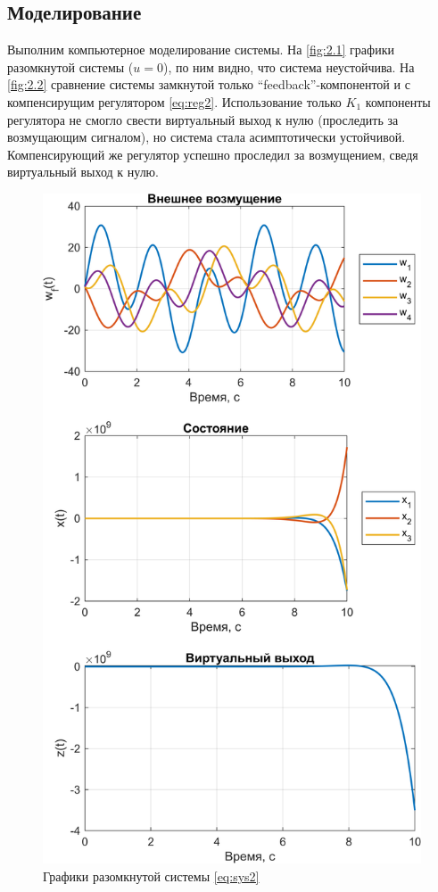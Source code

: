 \subsection{Моделирование}
Выполним компьютерное моделирование системы. На \autoref{fig:2.1} графики
разомкнутой системы ($u=0$), по ним видно, что система неустойчива. На
\autoref{fig:2.2} сравнение системы замкнутой только ``feedback''-компонентой
и с компенсирущим регулятором \eqref{eq:reg2}. Использование только $K_1$
компоненты регулятора не смогло свести виртуальный выход к нулю (проследить за 
возмущающим сигналом), но система стала асимптотически устойчивой. 
Компенсирующий же регулятор успешно проследил за возмущением,
сведя виртуальный выход к нулю.
\begin{figure}[H]
    \centering
    \includegraphics[width=0.8\linewidth]{figs/task2_1.png}
    \caption{Графики разомкнутой системы \eqref{eq:sys2}}
    \label{fig:2.1}
\end{figure}
